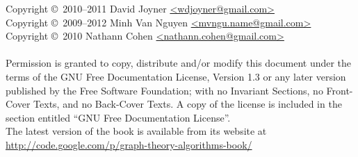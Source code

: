 \noindent Copyright \copyright\ 2010--2011 David Joyner \url{<wdjoyner@gmail.com>} \\
Copyright \copyright\ 2009--2012 Minh Van Nguyen \url{<mvngu.name@gmail.com>} \\
Copyright \copyright\ 2010 Nathann Cohen \url{<nathann.cohen@gmail.com>} \\\\
Permission is granted to copy, distribute and/or modify this document
under the terms of the GNU Free Documentation License, Version 1.3
or any later version published by the Free Software Foundation;
with no Invariant Sections, no Front-Cover Texts, and no
Back-Cover Texts. A copy of the license is included in the section
entitled ``GNU Free Documentation License''. \\

\noindent
The latest version of the book is available from its website at \\

\url{http://code.google.com/p/graph-theory-algorithms-book/}
